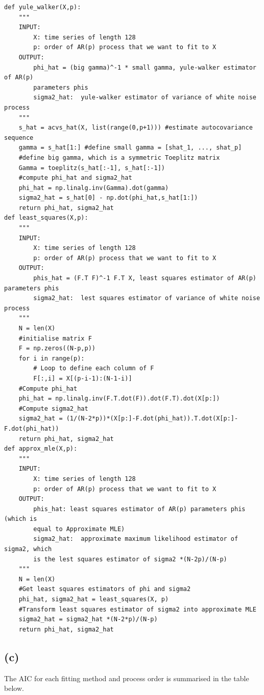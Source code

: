 \documentclass[a4paper,10pt]{article}
\theoremstyle{mytheor}
\begin{document}
\begin{lstlisting}
def yule_walker(X,p):
    """
    INPUT:
        X: time series of length 128
        p: order of AR(p) process that we want to fit to X
    OUTPUT:
        phi_hat = (big gamma)^-1 * small gamma, yule-walker estimator of AR(p)
        parameters phis
        sigma2_hat:  yule-walker estimator of variance of white noise process
    """
    s_hat = acvs_hat(X, list(range(0,p+1))) #estimate autocovariance sequence
    gamma = s_hat[1:] #define small gamma = [shat_1, ..., shat_p]
    #define big gamma, which is a symmetric Toeplitz matrix
    Gamma = toeplitz(s_hat[:-1], s_hat[:-1]) 
    #compute phi_hat and sigma2_hat
    phi_hat = np.linalg.inv(Gamma).dot(gamma)
    sigma2_hat = s_hat[0] - np.dot(phi_hat,s_hat[1:])
    return phi_hat, sigma2_hat
def least_squares(X,p):
    """
    INPUT:
        X: time series of length 128
        p: order of AR(p) process that we want to fit to X
    OUTPUT:
        phis_hat = (F.T F)^-1 F.T X, least squares estimator of AR(p) parameters phis
        sigma2_hat:  lest squares estimator of variance of white noise process
    """
    N = len(X)
    #initialise matrix F
    F = np.zeros((N-p,p))
    for i in range(p):
        # Loop to define each column of F
        F[:,i] = X[(p-i-1):(N-1-i)]
    #Compute phi_hat
    phi_hat = np.linalg.inv(F.T.dot(F)).dot(F.T).dot(X[p:])
    #Compute sigma2_hat
    sigma2_hat = (1/(N-2*p))*(X[p:]-F.dot(phi_hat)).T.dot(X[p:]-F.dot(phi_hat))
    return phi_hat, sigma2_hat
def approx_mle(X,p):
    """
    INPUT:
        X: time series of length 128
        p: order of AR(p) process that we want to fit to X
    OUTPUT:
        phis_hat: least squares estimator of AR(p) parameters phis (which is 
        equal to Approximate MLE)
        sigma2_hat:  approximate maximum likelihood estimator of sigma2, which
        is the lest squares estimator of sigma2 *(N-2p)/(N-p)
    """
    N = len(X)
    #Get least squares estimators of phi and sigma2
    phi_hat, sigma2_hat = least_squares(X, p)
    #Transform least squares estimator of sigma2 into approximate MLE
    sigma2_hat = sigma2_hat *(N-2*p)/(N-p)
    return phi_hat, sigma2_hat
\end{lstlisting}

\subsection*{(c)}

The AIC for each fitting method and process order is summarised in the table below. \\
\end{document}
